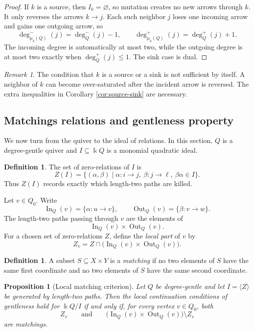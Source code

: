 \documentclass[11pt]{article}
\newcommand{\K}{\Bbbk}
\newcommand{\In}{\operatorname{In}}
\newcommand{\Out}{\operatorname{Out}}
\theoremstyle{plain}
\newtheorem{proposition}[theorem]{Proposition}
\theoremstyle{definition}
\newtheorem{definition}[theorem]{Definition}
\theoremstyle{remark}
\newtheorem{remark}[theorem]{Remark}
\begin{document}
\begin{proof}
If \(k\) is a source, then \(I_k=\varnothing\), so mutation creates no new
arrows through \(k\).  It only reverses the arrows \(k\to j\).  Each such
neighbor \(j\) loses one incoming arrow and gains one outgoing arrow, so
\[
  \deg_{\mu_k(Q)}^-(j)=\deg_Q^-(j)-1,
  \qquad
  \deg_{\mu_k(Q)}^+(j)=\deg_Q^+(j)+1.
\]
The incoming degree is automatically at most two, while the outgoing degree is
at most two exactly when \(\deg_Q^+(j)\leq 1\).  The sink case is dual.
\end{proof}

\begin{remark}
The condition that \(k\) is a source or a sink is not sufficient by itself.  A
neighbor of \(k\) can become over-saturated after the incident arrow is reversed.
The extra inequalities in Corollary \ref{cor:source-sink} are necessary.
\end{remark}

\subsection{Matchings relations and gentleness property}

We now turn from the quiver to the ideal of relations.  In this section, \(Q\)
is a degree-gentle quiver and \(I\subseteq \K Q\) is a monomial quadratic ideal.

\begin{definition}
The set of zero-relations of \(I\) is
\[
  Z(I)=\{(\alpha,\beta)\mid \alpha:i\to j,
  \ \beta:j\to \ell,\ \beta\alpha\in I\}.
\]
Thus \(Z(I)\) records exactly which length-two paths are killed.
\end{definition}

Let \(v\in Q_0\).  Write
\[
  \In_Q(v)=\{\alpha:u\to v\},
  \qquad
  \Out_Q(v)=\{\beta:v\to w\}.
\]
The length-two paths passing through \(v\) are the elements of
\[
  \In_Q(v)\times \Out_Q(v).
\]
For a chosen set of zero-relations \(Z\), define the \emph{local part} of \(v\) by
\[
  Z_v=Z\cap \bigl(\In_Q(v)\times \Out_Q(v)\bigr).
\]

\begin{definition}
A subset \(S\subseteq X\times Y\) is a \emph{matching} if no two elements of
\(S\) have the same first coordinate and no two elements of \(S\) have the same
second coordinate.
\end{definition}

\begin{proposition}[Local matching criterion]\label{prop:matching}
Let \(Q\) be degree-gentle and let \(I=\langle Z\rangle\) be generated by
length-two paths.  Then the local continuation conditions of gentleness hold for
\(\K Q/I\) if and only if, for every vertex \(v\in Q_0\), both
\[
  Z_v
  \qquad\text{and}\qquad
  \bigl(\In_Q(v)\times \Out_Q(v)\bigr)\setminus Z_v
\]
are matchings.
\end{proposition}
\end{document}
